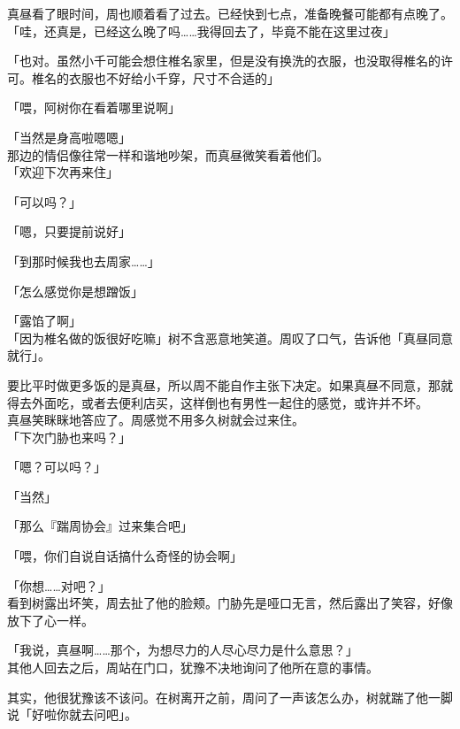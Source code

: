 真昼看了眼时间，周也顺着看了过去。已经快到七点，准备晚餐可能都有点晚了。\\

「哇，还真是，已经这么晚了吗……我得回去了，毕竟不能在这里过夜」

「也对。虽然小千可能会想住椎名家里，但是没有换洗的衣服，也没取得椎名的许可。椎名的衣服也不好给小千穿，尺寸不合适的」

「喂，阿树你在看着哪里说啊」

「当然是身高啦嗯嗯」\\

那边的情侣像往常一样和谐地吵架，而真昼微笑看着他们。\\

「欢迎下次再来住」

「可以吗？」

「嗯，只要提前说好」

「到那时候我也去周家……」

「怎么感觉你是想蹭饭」

「露馅了啊」\\

「因为椎名做的饭很好吃嘛」树不含恶意地笑道。周叹了口气，告诉他「真昼同意就行」。

要比平时做更多饭的是真昼，所以周不能自作主张下决定。如果真昼不同意，那就得去外面吃，或者去便利店买，这样倒也有男性一起住的感觉，或许并不坏。\\

真昼笑眯眯地答应了。周感觉不用多久树就会过来住。\\

「下次门胁也来吗？」

「嗯？可以吗？」

「当然」

「那么『踹周协会』过来集合吧」

「喂，你们自说自话搞什么奇怪的协会啊」

「你想……对吧？」\\

看到树露出坏笑，周去扯了他的脸颊。门胁先是哑口无言，然后露出了笑容，好像放下了心一样。\\

\vspace{2\baselineskip}

「我说，真昼啊……那个，为想尽力的人尽心尽力是什么意思？」\\

其他人回去之后，周站在门口，犹豫不决地询问了他所在意的事情。

其实，他很犹豫该不该问。在树离开之前，周问了一声该怎么办，树就踹了他一脚说「好啦你就去问吧」。

